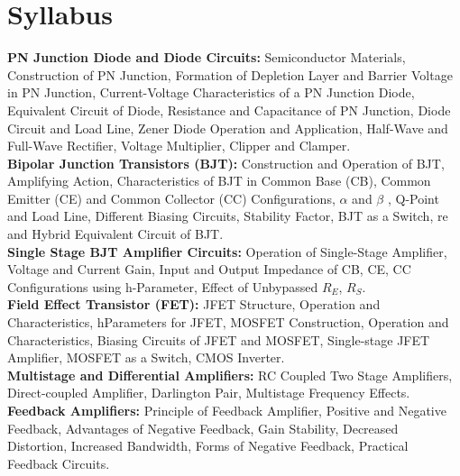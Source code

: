 \documentclass[a5paper,10pt]{report}
\begin{document}
    \chapter*{Syllabus}
    \thispagestyle{empty}
    \vspace*{-2.7cm}
    \textbf{PN Junction Diode and Diode Circuits:} Semiconductor Materials, Construction
of PN Junction, Formation of Depletion Layer and Barrier Voltage in PN Junction,
Current-Voltage Characteristics of a PN Junction Diode, Equivalent Circuit of
Diode, Resistance and Capacitance of PN Junction, Diode Circuit and Load Line,
Zener Diode Operation and Application, Half-Wave and Full-Wave Rectifier, Voltage Multiplier, Clipper and Clamper. \\ [5pt]
\textbf{Bipolar Junction Transistors (BJT):} Construction and Operation of BJT,
Amplifying Action, Characteristics of BJT in Common Base (CB), Common
Emitter (CE) and Common Collector (CC) Configurations, $\alpha$ and $\beta$ , Q-Point and Load Line, Different Biasing Circuits, Stability Factor, BJT as a Switch, re and
Hybrid Equivalent Circuit of BJT. \\ [5pt]
\textbf{Single Stage BJT Amplifier Circuits: }Operation of Single-Stage Amplifier,
Voltage and Current Gain, Input and Output Impedance of CB, CE, CC
Configurations using h-Parameter, Effect of Unbypassed $R_E$, $R_S$. \\ [5pt]
\textbf{Field Effect Transistor (FET): }JFET Structure, Operation and Characteristics, hParameters for JFET, MOSFET Construction, Operation and Characteristics,
Biasing Circuits of JFET and MOSFET, Single-stage JFET Amplifier, MOSFET as
a Switch, CMOS Inverter. \\ [5pt]
\textbf{Multistage and Differential Amplifiers: } RC Coupled Two Stage Amplifiers,
Direct-coupled Amplifier, Darlington Pair, Multistage Frequency Effects. \\ [5pt]
\textbf{Feedback Amplifiers: } Principle of Feedback Amplifier, Positive and Negative
Feedback, Advantages of Negative Feedback, Gain Stability, Decreased Distortion,
Increased Bandwidth, Forms of Negative Feedback, Practical Feedback Circuits. 
\newpage
\end{document}
